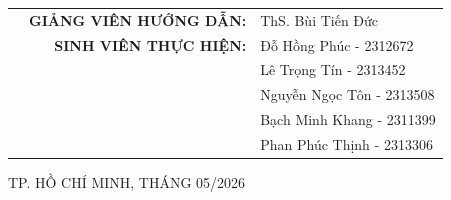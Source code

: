 \documentclass[12pt,a4paper]{article}
\begin{document}
\begin{titlepage}
		\vspace{0.1cm}
		\begin{center}
		    \begin{table}[h]
			\begin{tabular}{rrl}
				\hspace{1.5 cm} & \textbf{GIẢNG VIÊN HƯỚNG DẪN:} & ThS. Bùi Tiến Đức \\
                & \textbf{SINH VIÊN THỰC HIỆN:} & Đỗ Hồng Phúc - 2312672\\
                & & Lê Trọng Tín - 2313452\\
				& & Nguyễn Ngọc Tôn - 2313508 \\
                & & Bạch Minh Khang - 2311399\\
                & & Phan Phúc Thịnh - 2313306
			\end{tabular}
		\end{table}
		\end{center}
		
		\vfill 
		\begin{center}
			{\footnotesize TP. HỒ CHÍ MINH, THÁNG 05/2026}
		\end{center}
		\vspace*{0.5cm}
	\end{titlepage}
	
	
	\thispagestyle{empty}
	
	\newpage
	\tableofcontents
    
	


\newpage

\newpage

\newpage

\newpage

\newpage

\newpage

\newpage

\newpage

\end{document}
